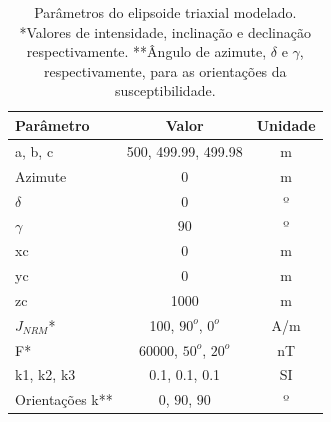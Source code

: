 \begin{table}[h!]
	\begin{center}
		\begin{tabular}{|l|c|c|}
			\hline
			\textbf{Parâmetro}  & \textbf{Valor} & \textbf{Unidade} \\
			\hline 
			a, b, c   & 500, 499.99, 499.98 & m\\
			\hline
			Azimute   & $0$ & m\\
			\hline
			$\delta$    & $0$ & º\\
			\hline
			$\gamma$   & $90$  & º\\
			\hline
			xc   & 0  & m\\
			\hline          
			yc   & 0  & m\\
			\hline                
			zc   & 1000 & m \\
			\hline
			$J_{NRM}$*  & 100, $90^o$, $0^o$ & A/m \\
			\hline
			F*    & 60000, $50^o$, $20^o$ & nT \\
			\hline
			k1, k2, k3   & 0.1, 0.1, 0.1 & SI \\
			\hline
			Orientações k**   & $0$, $90$, $90$ & º \\
			\hline
		\end{tabular}
		\caption{Parâmetros do elipsoide triaxial modelado. *Valores de intensidade, inclinação e declinação respectivamente. **Ângulo de azimute, $\delta$ e $\gamma$, respectivamente, para as orientações da susceptibilidade.}
	\end{center}
	\label{tab:triaxial_oblate1}
\end{table}

\vspace{2cm}

